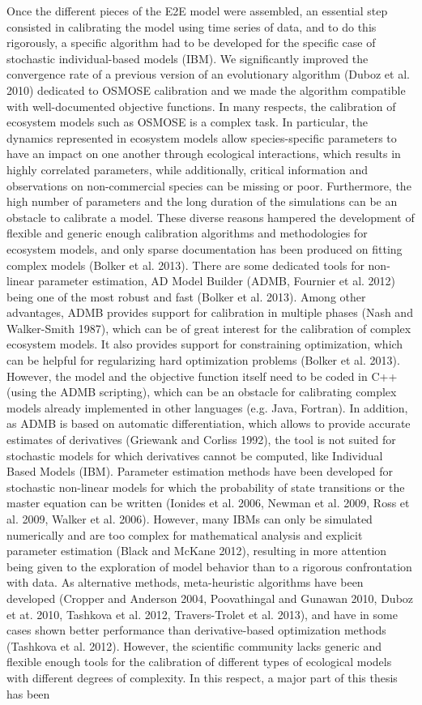 Once the different pieces of the E2E model were assembled, an essential step consisted in calibrating the model using time series of data, and to do this rigorously, a specific algorithm had to be developed for the specific case of stochastic individual-based models (IBM). We significantly improved the convergence rate of a previous version of an evolutionary algorithm (Duboz et al. 2010) dedicated to OSMOSE calibration and we made the algorithm compatible with well-documented objective functions. In many respects, the calibration of ecosystem models such as OSMOSE is a complex task. In particular, the dynamics represented in ecosystem models allow species-specific parameters to have an impact on one another through ecological interactions, which results in highly correlated parameters, while additionally, critical information and observations on non-commercial species can be missing or poor. Furthermore, the high number of parameters and the long duration of the simulations can be an obstacle to calibrate a model. These diverse reasons hampered the development of flexible and generic enough calibration algorithms and methodologies for ecosystem models, and only sparse documentation has been produced on fitting complex models (Bolker et al. 2013). There are some dedicated tools for non-linear parameter estimation, AD Model Builder (ADMB, Fournier et al. 2012) being one of the most robust and fast (Bolker et al. 2013). Among other advantages, ADMB provides support for calibration in multiple phases (Nash and Walker-Smith 1987), which can be of great interest for the calibration of complex ecosystem models. It also provides support for constraining optimization, which can be helpful for regularizing hard optimization problems (Bolker et al. 2013). However, the model and the objective function itself need to be coded in C++ (using the ADMB scripting), which can be an obstacle for calibrating complex models already implemented in other languages (e.g. Java, Fortran). In addition, as ADMB is based on automatic differentiation, which allows to provide accurate estimates of derivatives (Griewank and Corliss 1992), the tool is not suited for stochastic models for which derivatives cannot be computed, like Individual Based Models (IBM). Parameter estimation methods have been developed for stochastic non-linear models for which the probability of state transitions or the master equation can be written (Ionides et al. 2006, Newman et al. 2009, Ross et al. 2009, Walker et al. 2006). However, many IBMs can only be simulated numerically and are too complex for mathematical analysis and explicit parameter estimation (Black and McKane 2012), resulting in more attention being given to the exploration of model behavior than to a rigorous confrontation with data. As alternative methods, meta-heuristic algorithms have been developed (Cropper and Anderson 2004, Poovathingal and Gunawan 2010, Duboz et at. 2010, Tashkova et al. 2012, Travers-Trolet et al. 2013), and have in some cases shown better performance than derivative-based optimization methods (Tashkova et al. 2012). However, the scientific community lacks generic and flexible enough tools for the calibration of different types of ecological models with different degrees of complexity. In this respect, a major part of this thesis has been 